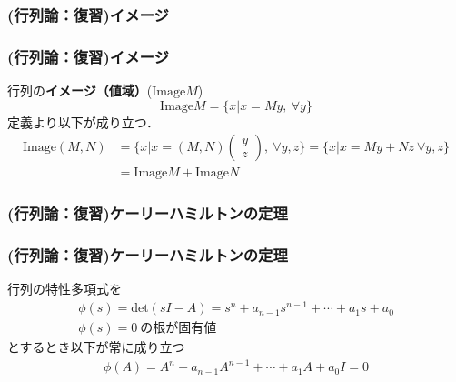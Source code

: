 \begin{frame}[t]
\frametitle{(行列論：復習)イメージ}
\subsubsection{(行列論：復習)イメージ}

行列の{\bf {イメージ（値域）}}($\mbox{Image} M$)
\begin{equation}
	\mbox{Image} M = \{x \vert x=My, \ \forall y\}
\end{equation}
定義より以下が成り立つ．
\begin{align}
	\mbox{Image} (M,N) 
	  &= \{x \vert x=(M,N) \left( \begin{array}{c} y \\z \end{array} \right), \ \forall y,z\}
	   = \{x \vert x= My + Nz \ \forall y,z\}
\nonumber \\
	  &= \mbox{Image}M + \mbox{Image}N
\end{align}




\end{frame}

\begin{frame}[t]
\frametitle{(行列論：復習)ケーリーハミルトンの定理}
\subsubsection{(行列論：復習)ケーリーハミルトンの定理}

行列の特性多項式を
\begin{align}
	\phi(s) = \mbox{det} (sI-A)=s^n + a_{n-1} s^{n-1} + \cdots + a_1 s + a_0 
\\
    \phi(s)=0 \ \mbox{の根が固有値} \nonumber
\end{align}
とするとき以下が常に成り立つ
\begin{align}
	\phi(A) = A^n + a_{n-1} A^{n-1} + \cdots + a_1 A + a_0 I = 0
\end{align}
\end{frame}

